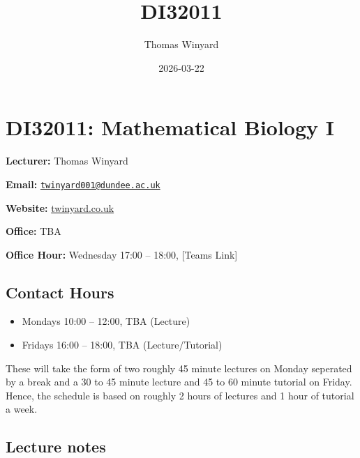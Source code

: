 \documentclass[
  letterpaper,
  DIV=11,
  numbers=noendperiod]{scrreprt}
\title{DI32011}
\author{Thomas Winyard}
\date{2026-03-22}
\providecommand{\tightlist}{%
  \setlength{\itemsep}{0pt}\setlength{\parskip}{0pt}}
\renewcommand*\contentsname{Table of contents}
\newcommand\contentsname{Table of contents}
\begin{document}
\maketitle

\renewcommand*\contentsname{Table of contents}
{
\setcounter{tocdepth}{2}
\tableofcontents
}


\chapter*{DI32011: Mathematical Biology
I}\label{di32011-mathematical-biology-i}


\textbf{Lecturer:} Thomas Winyard

\textbf{Email:}
\href{mailto:twinyard001@dundee.ac.uk}{\nolinkurl{twinyard001@dundee.ac.uk}}

\textbf{Website:} \href{www.twinyard.co.uk}{twinyard.co.uk}

\textbf{Office:} TBA

\textbf{Office Hour:} Wednesday 17:00 -- 18:00, {[}Teams Link{]}

\section*{Contact Hours}\label{contact-hours}


\begin{itemize}
\tightlist
\item
  Mondays 10:00 -- 12:00, TBA (Lecture)
\item
  Fridays 16:00 -- 18:00, TBA (Lecture/Tutorial)
\end{itemize}

These will take the form of two roughly 45 minute lectures on Monday
seperated by a break and a 30 to 45 minute lecture and 45 to 60 minute
tutorial on Friday. Hence, the schedule is based on roughly 2 hours of
lectures and 1 hour of tutorial a week.

\section*{Lecture notes}\label{lecture-notes}
\end{document}

